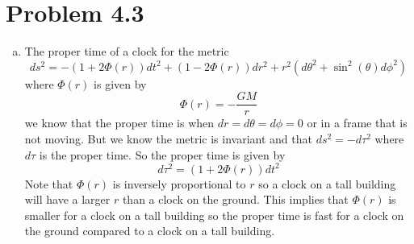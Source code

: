 \documentclass[11pt]{article}
\numberwithin{equation}{section}
\newcommand{\HWnum}{4}
\begin{document}
\section{Problem \HWnum.3}
\begin{enumerate}[(a)]
\item
The proper time of a clock for the metric 
$$ds^2 = -(1+2\Phi(r))dt^2 + (1-2\Phi(r))dr^2 + r^2(d\theta^2+\sin^2(\theta)d\phi^2)$$
where $\Phi(r)$ is given by
$$\Phi(r) = -\frac{GM}{r}$$
we know that the proper time is when $dr = d\theta = d\phi = 0$ or in a frame that is not moving. But we know the metric is invariant and that $ds^2 = -d\tau^2$ where $d\tau$ is the proper time. So the proper time is given by
$$d\tau^2 = (1+2\Phi(r))dt^2$$
Note that $\Phi(r)$ is inversely proportional to $r$ so a clock on a tall building will have a larger $r$ than a clock on the ground. This implies that $\Phi(r)$ is smaller for a clock on a tall building so the proper time is fast for a clock on the ground compared to a clock on a tall building.


\end{enumerate}
\end{document}
